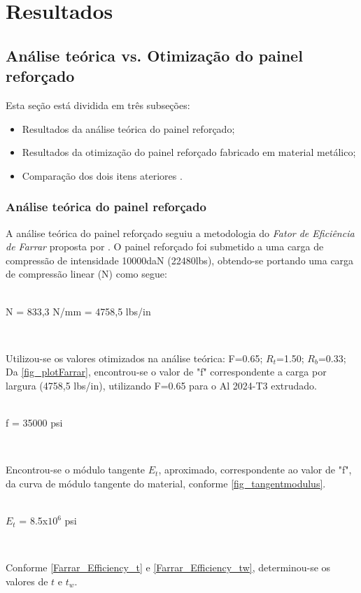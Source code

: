 \chapter[Resultados]{Resultados}

\section{Análise teórica vs. Otimização do painel reforçado}
Esta seção está dividida em três subseções:
\begin{itemize}
\item Resultados da análise teórica do painel reforçado;
\item Resultados da otimização do painel reforçado fabricado em material metálico;
\item Comparação dos dois itens ateriores .
\end{itemize}

\subsection{Análise teórica do painel reforçado}
A análise teórica do painel reforçado seguiu a metodologia do \emph{Fator de Eficiência de Farrar} proposta por \cite{niu1997airframe}. O painel reforçado foi submetido a uma carga de compressão de intensidade 10000daN (22480lbs), obtendo-se portando uma carga de compressão linear (N) como segue:\\~\\

\centerline{N = 833,3 N/mm = 4758,5 lbs/in}\


Utilizou-se os valores otimizados na análise teórica:
F=0.65; $R_t$=1.50; $R_b$=0.33;
Da \autoref{fig_plotFarrar}, encontrou-se o valor de "f" correspondente a carga por largura (4758,5 lbs/in), utilizando F=0.65 para o Al 2024-T3 extrudado.\\~\\


\centerline{f = 35000 psi}\

Encontrou-se o módulo tangente $E_t$, aproximado, correspondente ao valor de "f", da curva de módulo tangente do material, conforme \autoref{fig_tangentmodulus}.\\~\\

\centerline{$E_t$ = 8.5x$10^6$ psi}
\

Conforme \autoref{Farrar_Efficiency_t} e \autoref{Farrar_Efficiency_tw}, determinou-se os valores de $t$ e $t_w$.\\~\\

